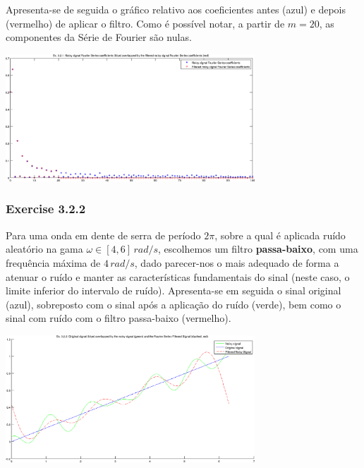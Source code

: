 \documentclass[a4paper]{article}
\begin{document}
\clearpage
\noindent Apresenta-se de seguida o gráfico relativo aos coeficientes antes (azul) e depois (vermelho) de aplicar o filtro. Como é possível notar, a partir de $m = 20$, as componentes da Série de Fourier são nulas.
\begin{center}
	\includegraphics[width=0.70\textwidth]{images/ex3_2_1_coeffs.png}
	\label{fig:ex3_2_1_coeffs}
\end{center}

\subsubsection{Exercise 3.2.2}
\noindent Para uma onda em dente de serra de período $2 \pi$, sobre a qual é aplicada ruído aleatório na gama $\omega \in [4, 6] \, rad/s$, escolhemos um filtro \textbf{passa-baixo}, com uma frequência máxima de $4 \, rad/s$, dado parecer-nos o mais adequado de forma a atenuar o ruído e manter as características fundamentais do sinal (neste caso, o limite inferior do intervalo de ruído). Apresenta-se em seguida o sinal original (azul), sobreposto com o sinal após a aplicação do ruído (verde), bem como o sinal com ruído com o filtro passa-baixo (vermelho).

\begin{center}
	\includegraphics[width=0.70\textwidth]{images/ex3_2_2_plot.png}
	\label{fig:ex3_2_2_plot}
\end{center}
\end{document}
